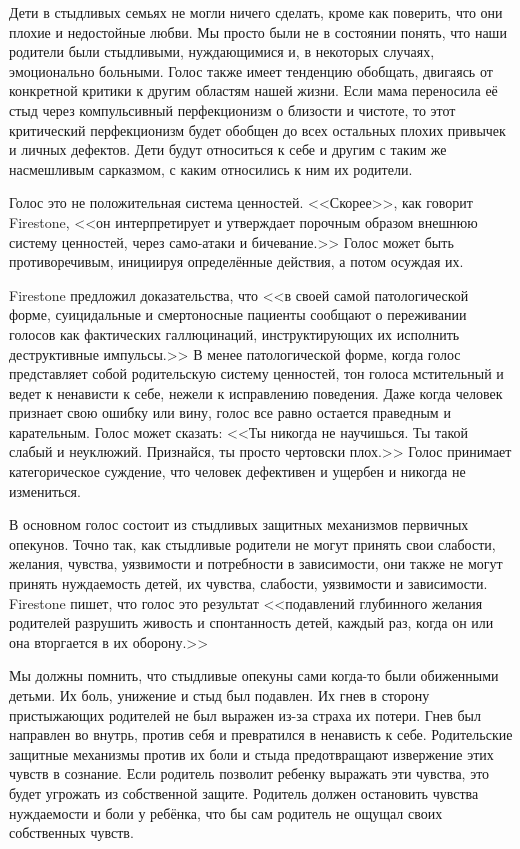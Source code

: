 \documentclass[10pt, fleqn]{article}
\begin{document}
Дети в стыдливых семьях не могли ничего сделать, кроме как поверить, что они плохие и недостойные любви. Мы просто были не в состоянии понять, что наши родители были стыдливыми, нуждающимися и, в некоторых случаях, эмоционально больными. Голос также имеет тенденцию обобщать, двигаясь от конкретной критики к другим областям нашей жизни. Если мама переносила её стыд через компульсивный перфекционизм о близости и чистоте, то этот критический перфекционизм будет обобщен до всех остальных плохих привычек и личных дефектов. Дети будут относиться к себе и другим с таким же насмешливым сарказмом, с каким относились к ним их родители.

Голос это не положительная система ценностей. <<Скорее>>, как говорит Firestone, <<он интерпретирует и утверждает порочным образом внешнюю систему ценностей, через само-атаки и бичевание.>> Голос может быть противоречивым, инициируя определённые действия, а потом осуждая их.

Firestone предложил доказательства, что <<в своей самой патологической форме, суицидальные и смертоносные пациенты сообщают о переживании голосов как фактических галлюцинаций, инструктирующих их исполнить деструктивные импульсы.>> В менее патологической форме, когда голос представляет собой родительскую систему ценностей, тон голоса мстительный и ведет к ненависти к себе, нежели к исправлению поведения. Даже когда человек признает свою ошибку или вину, голос все равно остается праведным и карательным. Голос может сказать: <<Ты никогда не научишься. Ты такой слабый и неуклюжий. Признайся, ты просто чертовски плох.>> Голос принимает категорическое суждение, что человек дефективен и ущербен и никогда не измениться.

В основном голос состоит из стыдливых защитных механизмов первичных опекунов. Точно так, как стыдливые родители не могут принять свои слабости, желания, чувства, уязвимости и потребности в зависимости, они также не могут принять нуждаемость детей, их чувства, слабости, уязвимости и зависимости. Firestone пишет, что голос это результат <<подавлений глубинного желания родителей разрушить живость и спонтанность детей, каждый раз, когда он или она вторгается в их оборону.>>

Мы должны помнить, что стыдливые опекуны сами когда-то были обиженными детьми. Их боль, унижение и стыд был подавлен. Их гнев в сторону пристыжающих родителей не был выражен из-за страха их потери. Гнев был направлен во внутрь, против себя и превратился в ненависть к себе. Родительские защитные механизмы против их боли и стыда предотвращают извержение этих чувств в сознание. Если родитель позволит ребенку выражать эти чувства, это будет угрожать из собственной защите. Родитель должен остановить чувства нуждаемости и боли у ребёнка, что бы сам родитель не ощущал своих собственных чувств.
\end{document}
